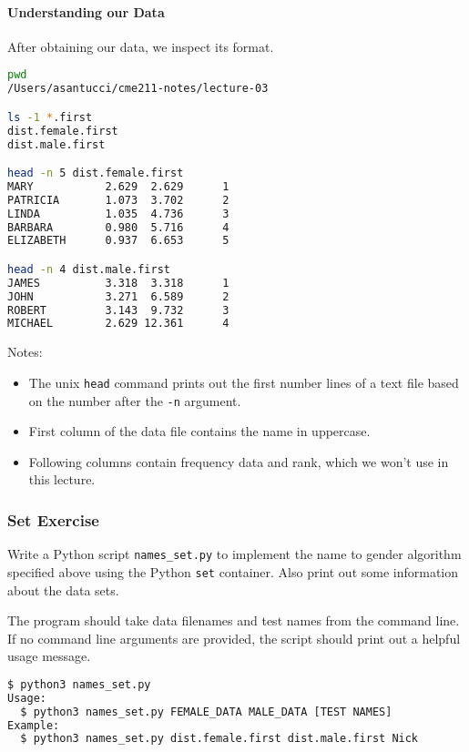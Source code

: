 \documentclass[12pt,letterpaper,twoside]{article}
\begin{document}
\paragraph{Understanding our Data} After obtaining our data, we inspect its format.
\begin{lstlisting}[language=bash]
pwd
/Users/asantucci/cme211-notes/lecture-03

ls -1 *.first
dist.female.first
dist.male.first

head -n 5 dist.female.first
MARY           2.629  2.629      1
PATRICIA       1.073  3.702      2
LINDA          1.035  4.736      3
BARBARA        0.980  5.716      4
ELIZABETH      0.937  6.653      5

head -n 4 dist.male.first
JAMES          3.318  3.318      1
JOHN           3.271  6.589      2
ROBERT         3.143  9.732      3
MICHAEL        2.629 12.361      4
\end{lstlisting}

Notes:

\begin{itemize}
\tightlist
\item
  The unix \texttt{head} command prints out the first number lines of a
  text file based on the number after the \texttt{-n} argument.
\item
  First column of the data file contains the name in uppercase.
\item
  Following columns contain frequency data and rank, which we won't use
  in this lecture.
\end{itemize}


\subsubsection{Set Exercise}

Write a Python script \texttt{names\_set.py} to implement the
name to gender algorithm specified above using the Python \texttt{set}
container. Also print out some information about the data sets.

The program should take data filenames and test names from the command
line. If no command line arguments are provided, the script should print
out a helpful usage message.

\begin{lstlisting}[language=bash]
$ python3 names_set.py
Usage:
  $ python3 names_set.py FEMALE_DATA MALE_DATA [TEST NAMES]
Example:
  $ python3 names_set.py dist.female.first dist.male.first Nick
\end{lstlisting}
\end{document}
